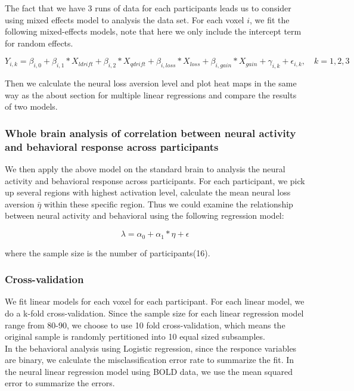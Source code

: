 
The fact that we have 3 runs of data for each participants leads us to consider using mixed effects model to analysis the data set. For each voxel $i$, we fit the following mixed-effects models, note that here we only include the intercept term for random effects. 

\begin{equation}
Y_{i, k} = \beta_{i, 0} + \beta_{i,1} *X_{ldrift} + \beta_{i, 2} * X_{qdrift} +  \beta_{i, loss} *X_{loss} + \beta_{i, gain} * X_{gain}  + \gamma _{i, k} + \epsilon_{i, k}, \quad k =1, 2, 3
\end{equation}

Then we calculate the neural loss aversion level and plot heat maps in the same way as the about section for multiple linear regressions and compare the results of two models. 

\subsubsection{Whole brain analysis of correlation between 
neural activity and behavioral response across participants}

We then apply the above model on the standard brain to analysis the neural 
activity and behavioral response across participants. For each participant, 
we pick up several regions with highest activation level, calculate the mean 
neural loss aversion $\bar{\eta}$ within these specific region. Thus we could 
examine the relationship between neural activity and behavioral using the 
following regression model:

\begin{equation}
\lambda = \alpha_0 + \alpha_1 * \eta + \epsilon
\end{equation}

where the sample size is the number of participants(16).

\subsubsection{Cross-validation}

We fit linear models for each voxel for each participant. For each linear
model, we do a k-fold cross-validation. Since the sample size for each linear 
regression model range from 80-90, we choose to use 10 fold cross-validation,
which means the original sample is randomly pertitioned into 10 equal sized 
subsamples. \\
In the behavioral analysis using Logistic regression, since the responce 
variables are binary, we calculate the misclassification error rate to 
summarize the fit. In the neural linear regression model using BOLD data, we 
use the mean squared error to summarize the errors.

